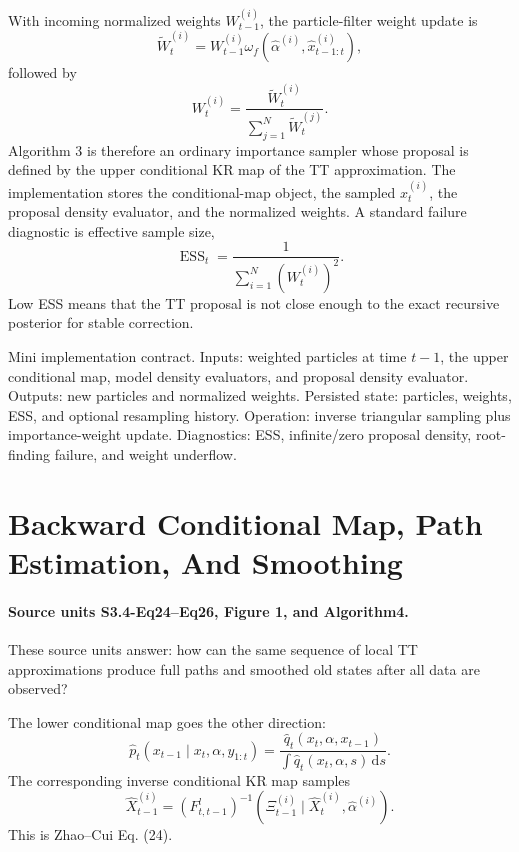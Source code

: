 \documentclass[11pt]{article}
\newcommand{\dd}{\,\mathrm d}
\begin{document}
With incoming normalized weights \(W_{t-1}^{(i)}\), the particle-filter weight
update is
\[
    \widetilde W_t^{(i)}
    =
    W_{t-1}^{(i)}
    \omega_f(\widehat\alpha^{(i)},\widehat x_{t-1:t}^{(i)}),
    \tag{F5}
\]
followed by
\[
    W_t^{(i)}
    =
    \frac{\widetilde W_t^{(i)}}
    {\sum_{j=1}^{N}\widetilde W_t^{(j)}}.
    \tag{F6}
\]
Algorithm 3 is therefore an ordinary importance sampler whose proposal is
defined by the upper conditional KR map of the TT approximation.  The
implementation stores the conditional-map object, the sampled \(x_t^{(i)}\),
the proposal density evaluator, and the normalized weights.  A standard failure
diagnostic is effective sample size,
\[
    \operatorname{ESS}_t
    =
    \frac{1}{\sum_{i=1}^{N}(W_t^{(i)})^2}.
    \tag{F7}
\]
Low ESS means that the TT proposal is not close enough to the exact recursive
posterior for stable correction.

Mini implementation contract.  Inputs: weighted particles at time \(t-1\), the
upper conditional map, model density evaluators, and proposal density evaluator.
Outputs: new particles and normalized weights.  Persisted state: particles,
weights, ESS, and optional resampling history.  Operation: inverse triangular
sampling plus importance-weight update.  Diagnostics: ESS, infinite/zero
proposal density, root-finding failure, and weight underflow.

\section{Backward Conditional Map, Path Estimation, And Smoothing}

\paragraph{Source units S3.4-Eq24--Eq26, Figure 1, and Algorithm4.}
These source units answer: how can the same sequence of local TT approximations
produce full paths and smoothed old states after all data are observed?

The lower conditional map goes the other direction:
\[
    \widehat p_t(x_{t-1}\mid x_t,\alpha,y_{1:t})
    =
    \frac{\widehat q_t(x_t,\alpha,x_{t-1})}
    {\int \widehat q_t(x_t,\alpha,s)\dd s}.
    \tag{B1}
\]
The corresponding inverse conditional KR map samples
\[
    \widehat X_{t-1}^{(i)}
    =
    (F_{t,t-1}^{l})^{-1}
    \left(\Xi_{t-1}^{(i)}\mid \widehat X_t^{(i)},\widehat\alpha^{(i)}\right).
    \tag{B2}
\]
This is Zhao--Cui Eq. (24).
\end{document}
